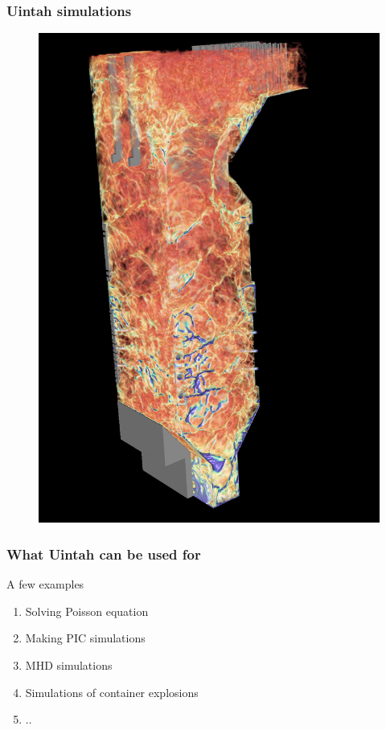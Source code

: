\documentclass{beamer}
\begin{document}
\begin{frame}[fragile]
 \frametitle{Uintah simulations}
 \begin{figure}
  \centering
  \includegraphics[height=0.7\textheight]{uintah4.png}
 \end{figure}
\end{frame}

\begin{frame}
 \frametitle{What Uintah can be used for}
 A few examples
 \begin{enumerate}
  \item Solving Poisson equation
  \item Making PIC simulations
  \item MHD simulations
  \item Simulations of container explosions
  \item ..
 \end{enumerate}
\end{frame}
\end{document}
